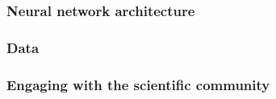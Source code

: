 \begin{frame}
    \frametitle{Neural network architecture}
\end{frame}

\begin{frame}
    \frametitle{Data}
\end{frame}

\begin{frame}
    \frametitle{Engaging with the scientific community}
\end{frame}

